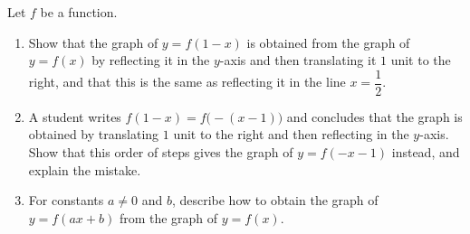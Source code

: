 Let $f$ be a function.
\begin{enumerate}
\item[(a)] Show that the graph of $y=f(1-x)$ is obtained from the graph of $y=f(x)$ by reflecting it in the $y$-axis and then translating it $1$ unit to the right, and that this is the same as reflecting it in the line $x=\dfrac12$.
\item[(b)] A student writes $f(1-x)=f\bigl(-(x-1)\bigr)$ and concludes that the graph is obtained by translating $1$ unit to the right and then reflecting in the $y$-axis. Show that this order of steps gives the graph of $y=f(-x-1)$ instead, and explain the mistake.
\item[(c)] For constants $a\ne0$ and $b$, describe how to obtain the graph of $y=f(ax+b)$ from the graph of $y=f(x)$.
\end{enumerate}
